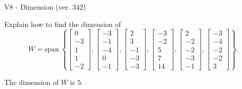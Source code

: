 \begin{exercise}
  \begin{exerciseTitle}V8 - Dimension (ver. 342)\end{exerciseTitle}
  \begin{exerciseStatement}
    Explain how to find the dimension of 
\[W=\mathrm{span}\ \left\{\left[\begin{array}{r}
0 \\
-3 \\
1 \\
1 \\
-2
\end{array}\right] , \left[\begin{array}{r}
-3 \\
-1 \\
-4 \\
0 \\
-1
\end{array}\right] , \left[\begin{array}{r}
2 \\
3 \\
-1 \\
-3 \\
-3
\end{array}\right] , \left[\begin{array}{r}
-3 \\
-2 \\
5 \\
7 \\
14
\end{array}\right] , \left[\begin{array}{r}
2 \\
-2 \\
-2 \\
-3 \\
-1
\end{array}\right] , \left[\begin{array}{r}
-3 \\
-4 \\
-2 \\
-2 \\
3
\end{array}\right]\right\}.\]



  \end{exerciseStatement}
  \begin{exerciseAnswer}
   The dimension of \(W\) is  \(5\).
  


  \end{exerciseAnswer}
\end{exercise}